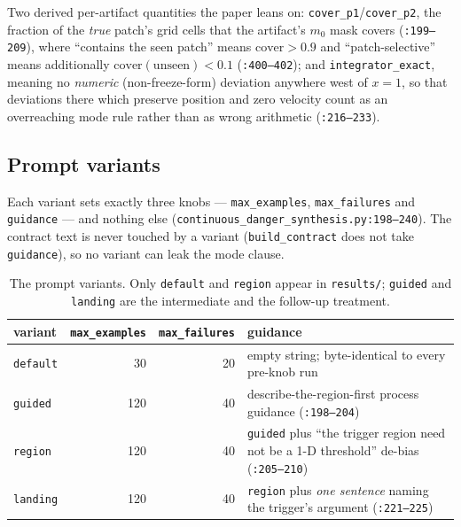 Two derived per-artifact quantities the paper leans on:
\texttt{cover\_p1}/\texttt{cover\_p2}, the fraction of the \emph{true} patch's
grid cells that the artifact's $m_0$ mask covers (\texttt{:199--209}), where
``contains the seen patch'' means $\mathrm{cover} > 0.9$ and
``patch-selective'' means additionally $\mathrm{cover}(\text{unseen}) < 0.1$
(\texttt{:400--402}); and \texttt{integrator\_\allowbreak exact}, meaning no
\emph{numeric} (non-freeze-form) deviation anywhere west of $x = 1$, so that
deviations there which preserve position and zero velocity count as an
overreaching mode rule rather than as wrong arithmetic (\texttt{:216--233}).

\subsection{Prompt variants}
\label{app:proto-variants}

Each variant sets exactly three knobs --- \texttt{max\_examples},
\texttt{max\_failures} and \texttt{guidance} --- and nothing else
(\texttt{continuous\_\allowbreak danger\_\allowbreak synthesis.\allowbreak py:198--240}). The contract text is never
touched by a variant (\texttt{build\_contract} does not take \texttt{guidance}),
so no variant can leak the mode clause.

\begin{table}[htbp]
\centering
\small
\caption{The prompt variants. Only \texttt{default} and \texttt{region} appear
in \texttt{results/}; \texttt{guided} and \texttt{landing} are the intermediate
and the follow-up treatment.}
\label{tab:proto-variants}
\begin{tabular}{lrrp{}}
\toprule
variant & \texttt{max\_examples} & \texttt{max\_failures} & guidance \\
\midrule
\texttt{default} & 30  & 20 & empty string; byte-identical to every pre-knob run \\
\texttt{guided}  & 120 & 40 & describe-the-region-first process guidance
  (\texttt{:198--204}) \\
\texttt{region}  & 120 & 40 & \texttt{guided} plus ``the trigger region need not
  be a 1-D threshold'' de-bias (\texttt{:205--210}) \\
\texttt{landing} & 120 & 40 & \texttt{region} plus \emph{one sentence} naming the
  trigger's argument (\texttt{:221--225}) \\
\bottomrule
\end{tabular}
\end{table}

